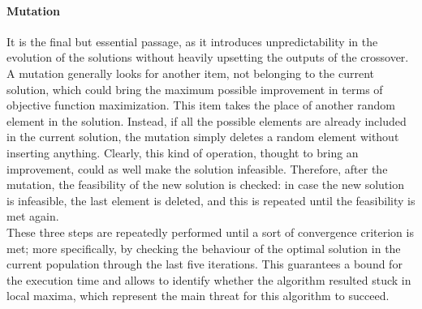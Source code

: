\documentclass{article}
\begin{document}
\paragraph{Mutation}
It is the final but essential passage, as it introduces unpredictability in the evolution of the solutions without heavily upsetting the outputs of the crossover. A mutation generally looks for another item, not belonging to the current solution, which could bring the maximum possible improvement in terms of objective function maximization. This item takes the place of another random element in the solution. Instead, if all the possible elements are already included in the current solution, the mutation simply deletes a random element without inserting anything. Clearly, this kind of operation, thought to bring an improvement, could as well make the solution infeasible. Therefore, after the mutation, the feasibility of the new solution is checked: in case the new solution is infeasible, the last element is deleted, and this is repeated until the feasibility is met again. \\

These three steps are repeatedly performed until a sort of convergence criterion is met; more specifically, by checking the behaviour of the optimal solution in the current population through the last five iterations. This guarantees a bound for the execution time and allows to identify whether the algorithm resulted stuck in local maxima, which represent the main threat for this algorithm to succeed.
\end{document}
